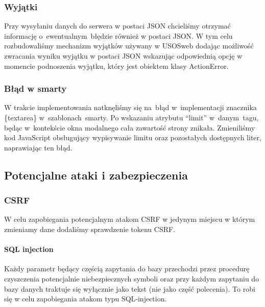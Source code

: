 \documentclass[licencjacka]{pracamgr}
\begin{document}
\subsubsection{Wyjątki}
Przy wysyłaniu danych do serwera w postaci JSON chcieliśmy otrzymać informację o~ewentualnym~błędzie również w postaci JSON. W tym celu rozbudowaliśmy mechanizm wyjątków używany w USOSweb dodając możliwość zwracania wyniku wyjątku w postaci JSON wskazując odpowiednią opcję w momencie podnoszenia wyjątku, który jest obiektem klasy ActionError.
\subsubsection{Błąd w smarty}
W trakcie implementowania natknęliśmy się na~błąd w~implementacji znacznika \{textarea\} w~szablonach~smarty. Po wskazaniu atrybutu \enquote{limit} w~danym~tagu, będąc w~kontekście okna modalnego cała zawartość strony znikała. Zmieniliśmy kod JavaScript obsługujący wypisywanie limitu oraz pozostałych dostępnych liter, naprawiając ten błąd.
\subsection{Potencjalne ataki i zabezpieczenia} \label{subsec:bezpiecz}
\subsubsection{CSRF}
W celu zapobiegania potencjalnym atakom CSRF w jedynym miejscu w którym zmieniamy dane dodaliśmy sprawdzenie tokenu CSRF.
\paragraph{SQL injection}
Każdy parametr będący częścią zapytania do bazy przechodzi przez procedurę czyszczenia potencjalnie niebezpiecznych symboli oraz przy każdym zapytaniu do bazy danych traktuje się wyłącznie jako tekst (nie jako część polecenia). To robi się w celu zapobiegania atakom typu SQL-injection.

\end{document}
